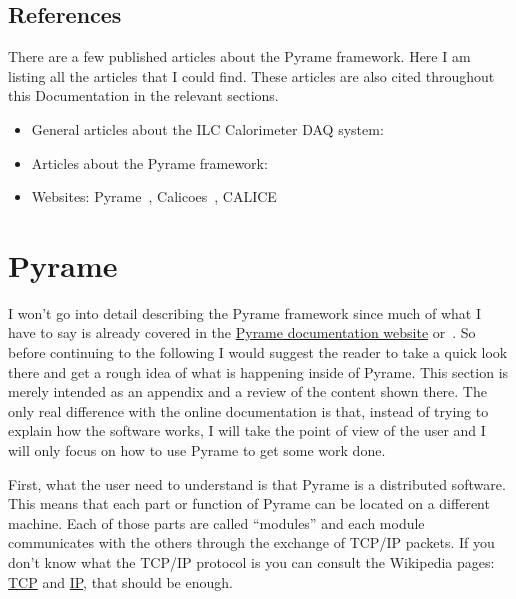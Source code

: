 \subsection{References}
There are a few published articles about the Pyrame framework. Here I am listing
all the articles that I could find. These articles are also cited throughout this
Documentation in the relevant sections.
\begin{itemize}
\item General articles about the ILC Calorimeter DAQ
  system:\cite{Gastaldi:2014vaa,Gastaldi:2014oid}
\item Articles about the Pyrame
  framework:\cite{Gastaldi:2014oid,Rubio-Roy:2015,Rubio-Roy:2017nco}
\item Websites: Pyrame~\cite{Pyrame}, Calicoes~\cite{Calicoes},
  CALICE\cite{CALICE-DAQ}
\end{itemize}

\section{Pyrame}
I won't go into detail describing the Pyrame framework since much of what I have
to say is already covered in the
\href{http://llr.in2p3.fr/sites/pyrame/documentation/}{Pyrame documentation
  website} or~\cite{Rubio-Roy:2015}. So before continuing to the following I
would suggest the reader to take a quick look there and get a rough idea of what
is happening inside of Pyrame. This section is merely intended as an appendix
and a review of the content shown there. The only real difference with the
online documentation is that, instead of trying to explain how the software
works, I will take the point of view of the user and I will only focus on how to
use Pyrame to get some work done.

First, what the user need to understand is that Pyrame is a distributed
software. This means that each part or function of Pyrame can be located on a
different machine. Each of those parts are called ``modules'' and each module
communicates with the others through the exchange of TCP/IP packets. If you
don't know what the TCP/IP protocol is you can consult the Wikipedia pages:
\href{https://en.wikipedia.org/wiki/Transmission_Control_Protocol}{TCP} and
\href{https://en.wikipedia.org/wiki/IPv4}{IP}, that should be enough.

